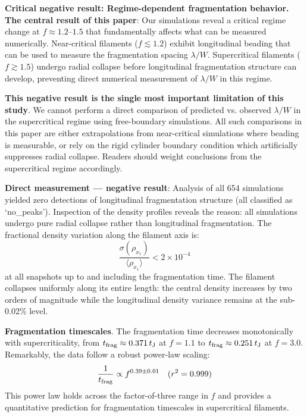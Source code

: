 \documentclass[twocolumn]{mnras}
\begin{document}
\textbf{Critical negative result: Regime-dependent fragmentation behavior.}
\textbf{The central result of this paper}: Our simulations reveal a critical regime change at $f \approx 1.2$--$1.5$ that fundamentally affects what can be measured numerically. Near-critical filaments ($f \lesssim 1.2$) exhibit longitudinal beading that can be used to measure the fragmentation spacing $\lambda/W$. Supercritical filaments ($f \gtrsim 1.5$) undergo radial collapse before longitudinal fragmentation structure can develop, preventing direct numerical measurement of $\lambda/W$ in this regime.

\textbf{This negative result is the single most important limitation of this study}. We cannot perform a direct comparison of predicted vs. observed $\lambda/W$ in the supercritical regime using free-boundary simulations. All such comparisons in this paper are either extrapolations from near-critical simulations where beading is measurable, or rely on the rigid cylinder boundary condition which artificially suppresses radial collapse. Readers should weight conclusions from the supercritical regime accordingly.

\textbf{Direct measurement --- negative result}: Analysis of all 654 simulations yielded zero detections of longitudinal fragmentation structure (all classified as `no\_peaks'). Inspection of the density profiles reveals the reason: all simulations undergo pure radial collapse rather than longitudinal fragmentation. The fractional density variation along the filament axis is:
\begin{equation}
\frac{\sigma(\rho_{x_1})}{\langle \rho_{x_1} \rangle} < 2 \times 10^{-4}
\end{equation}
at all snapshots up to and including the fragmentation time. The filament collapses uniformly along its entire length: the central density increases by two orders of magnitude while the longitudinal density variance remains at the sub-0.02\% level.

\textbf{Fragmentation timescales}. The fragmentation time decreases monotonically with supercriticality, from $t_{\rm frag} \approx 0.371\,t_{\rm J}$ at $f = 1.1$ to $t_{\rm frag} \approx 0.251\,t_{\rm J}$ at $f = 3.0$. Remarkably, the data follow a robust power-law scaling:
\begin{equation}
\frac{1}{t_{\rm frag}} \propto f^{0.39 \pm 0.01} \quad (r^2 = 0.999)
\end{equation}
This power law holds across the factor-of-three range in $f$ and provides a quantitative prediction for fragmentation timescales in supercritical filaments.
\end{document}
